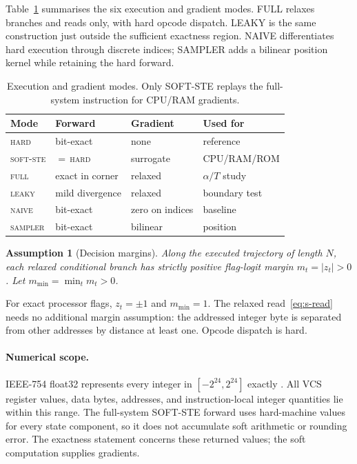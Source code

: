 \documentclass[letterpaper]{article} %
\newtheorem{assumption}{Assumption}
\begin{document}
Table~\ref{tab:s-modes} summarises the six execution
and gradient modes. FULL relaxes branches and reads only, with
hard opcode dispatch. LEAKY is the same construction just
outside the sufficient exactness region. NAIVE differentiates
hard execution through discrete indices; SAMPLER adds a
bilinear position kernel while retaining the hard forward.

\begin{table}[tbh]
\centering
\caption{Execution and gradient modes. Only SOFT-STE
replays the full-system instruction for CPU/RAM gradients.}
\label{tab:s-modes}
\small
\setlength{\tabcolsep}{4pt}
\begin{tabular}{@{}llll@{}}
\toprule
Mode & Forward & Gradient & Used for\\
\midrule
\textsc{hard} & bit-exact & none & reference\\
\textsc{soft-ste} & $=$\,\textsc{hard} & surrogate & CPU/RAM/ROM\\
\textsc{full} & exact in corner & relaxed & $\alpha/T$ study\\
\textsc{leaky} & mild divergence & relaxed & boundary test\\
\textsc{naive} & bit-exact & zero on indices & baseline\\
\textsc{sampler} & bit-exact & bilinear & position\\
\bottomrule
\end{tabular}
\end{table}

\begin{assumption}[Decision margins]
\label{ass:s-dm}
Along the executed trajectory of length $N$, each
relaxed conditional branch has strictly positive
flag-logit margin $m_t=|z_t|>0$.
Let $m_{\min}=\min_t m_t>0$.
\end{assumption}

For exact processor flags, $z_t=\pm1$ and $m_{\min}=1$.
The relaxed read~\eqref{eq:s-read} needs no additional
margin assumption: the addressed integer byte is
separated from other addresses by distance at least one.
Opcode dispatch is hard.

\paragraph{Numerical scope.}
IEEE-754 float32 represents every integer in
$[-2^{24},2^{24}]$ exactly
\citep{ieee754_2019,goldberg1991}. All VCS register
values, data bytes, addresses, and instruction-local
integer quantities lie within this range.
The full-system SOFT-STE forward uses hard-machine
values for every state component, so it does not
accumulate soft arithmetic or rounding error.
The exactness statement concerns these returned
values; the soft computation supplies gradients.
\end{document}
